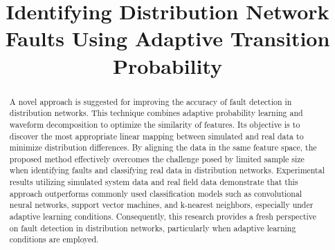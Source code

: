 \documentclass[conference]{IEEEtran}
\begin{document}
\title{Identifying Distribution Network Faults Using Adaptive Transition Probability}








\author{
\and
{}
\and
{}
}



\maketitle

\begin{abstract}
A novel approach is suggested for improving the accuracy of fault detection in distribution networks. This technique combines adaptive probability learning and waveform decomposition to optimize the similarity of features. Its objective is to discover the most appropriate linear mapping between simulated and real data to minimize distribution differences. By aligning the data in the same feature space, the proposed method effectively overcomes the challenge posed by limited sample size when identifying faults and classifying real data in distribution networks. Experimental results utilizing simulated system data and real field data demonstrate that this approach outperforms commonly used classification models such as convolutional neural networks, support vector machines, and k-nearest neighbors, especially under adaptive learning conditions. Consequently, this research provides a fresh perspective on fault detection in distribution networks, particularly when adaptive learning conditions are employed.
\end{abstract}
\end{document}

